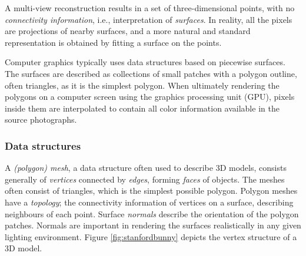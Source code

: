 A multi-view reconstruction results in a set of three-dimensional points, with no \emph{connectivity information}, i.e., interpretation of \emph{surfaces}.
In reality, all the pixels are projections of nearby surfaces, and a more natural and standard representation is obtained by fitting a surface on the points.

Computer graphics typically uses data structures based on piecewise surfaces.
The surfaces are described as collections of small patches with a polygon outline, often triangles, as it is the simplest polygon.
When ultimately rendering the polygons on a computer screen using the graphics processing unit (GPU), pixels inside them are interpolated to contain all color information available in the source photographs.


\subsubsection{Data structures} %



A \emph{(polygon) mesh}, a data structure often used to describe 3D models, consists generally of \emph{vertices} connected by \emph{edges}, forming \emph{faces} of objects.
The meshes often consist of triangles, which is the simplest possible polygon.
Polygon meshes have a \emph{topology}; the connectivity information of vertices on a surface, describing neighbours of each point.
Surface \emph{normals} describe the orientation of the polygon patches.
Normals are important in rendering the surfaces realistically in any given lighting environment.
Figure \ref{fig:stanfordbunny} depicts the vertex structure of a 3D model.


